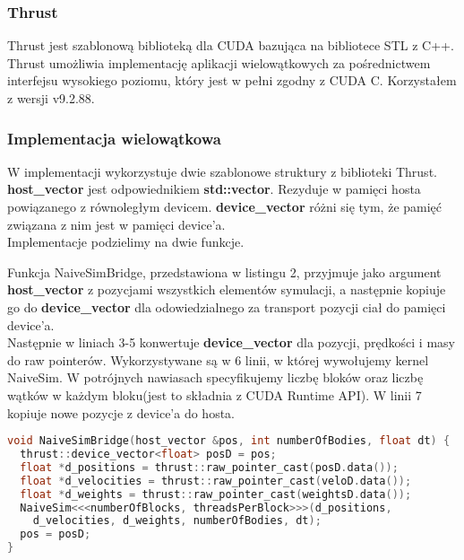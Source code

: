 \documentclass[14pt,twoside,a4paper]{article}
\begin{document}
\subsubsection{\large Thrust}
Thrust jest szablonową biblioteką dla CUDA bazująca na bibliotece STL z C++. Thrust umożliwia implementację aplikacji wielowątkowych za pośrednictwem interfejsu wysokiego poziomu, który jest w pełni zgodny z CUDA C. Korzystałem z wersji v9.2.88. 


\subsubsection{\large Implementacja wielowątkowa}
W implementacji wykorzystuje dwie szablonowe struktury z biblioteki Thrust.
\textbf{host\_vector} jest odpowiednikiem \textbf{std::vector}. Rezyduje w pamięci hosta powiązanego z równoległym devicem. \textbf{device\_vector} różni się tym, że pamięć związana z nim jest w pamięci device'a. \\ Implementacje podzielimy na dwie funkcje.\\
\bigskip

Funkcja NaiveSimBridge, przedstawiona w listingu 2, przyjmuje jako argument \textbf{host\_vector} z pozycjami wszystkich elementów symulacji, a następnie kopiuje go do \textbf{device\_vector} dla odowiedzialnego za transport pozycji ciał do pamięci device'a. \\Następnie w liniach 3-5 konwertuje \textbf{device\_vector} dla pozycji, prędkości i masy do raw pointerów. Wykorzystywane są w 6 linii, w której wywołujemy kernel NaiveSim. W potrójnych nawiasach specyfikujemy liczbę bloków oraz liczbę wątków w każdym bloku(jest to składnia z CUDA Runtime API). 
W linii 7 kopiuje nowe pozycje z device'a do hosta. 
\bigskip
\bigskip
\bigskip

\begin{lstlisting}[language=C++, frame=single, framerule=2pt, caption=Bridge pomiędzy główną pętlą a kernelem]
void NaiveSimBridge(host_vector &pos, int numberOfBodies, float dt) {
  thrust::device_vector<float> posD = pos;
  float *d_positions = thrust::raw_pointer_cast(posD.data());
  float *d_velocities = thrust::raw_pointer_cast(veloD.data());
  float *d_weights = thrust::raw_pointer_cast(weightsD.data());
  NaiveSim<<<numberOfBlocks, threadsPerBlock>>>(d_positions, 
  	d_velocities, d_weights, numberOfBodies, dt);
  pos = posD;
}
\end{lstlisting}
\end{document}

